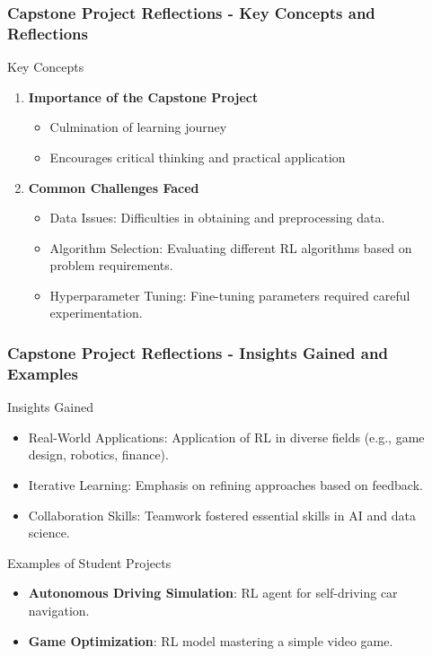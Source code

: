 \documentclass[aspectratio=169]{beamer}
\begin{document}
\begin{frame}[fragile]
    \frametitle{Capstone Project Reflections - Key Concepts and Reflections}
    \begin{block}{Key Concepts}
        \begin{enumerate}
            \item \textbf{Importance of the Capstone Project}
            \begin{itemize}
                \item Culmination of learning journey
                \item Encourages critical thinking and practical application
            \end{itemize}

            \item \textbf{Common Challenges Faced}
            \begin{itemize}
                \item Data Issues: Difficulties in obtaining and preprocessing data. 
                \item Algorithm Selection: Evaluating different RL algorithms based on problem requirements.
                \item Hyperparameter Tuning: Fine-tuning parameters required careful experimentation.
            \end{itemize}
        \end{enumerate}
    \end{block}
\end{frame}

\begin{frame}[fragile]
    \frametitle{Capstone Project Reflections - Insights Gained and Examples}
    \begin{block}{Insights Gained}
        \begin{itemize}
            \item Real-World Applications: Application of RL in diverse fields (e.g., game design, robotics, finance).
            \item Iterative Learning: Emphasis on refining approaches based on feedback.
            \item Collaboration Skills: Teamwork fostered essential skills in AI and data science.
        \end{itemize}
    \end{block}
    
    \begin{block}{Examples of Student Projects}
        \begin{itemize}
            \item \textbf{Autonomous Driving Simulation}: RL agent for self-driving car navigation.
            \item \textbf{Game Optimization}: RL model mastering a simple video game.
        \end{itemize}
    \end{block}
\end{frame}
\end{document}
